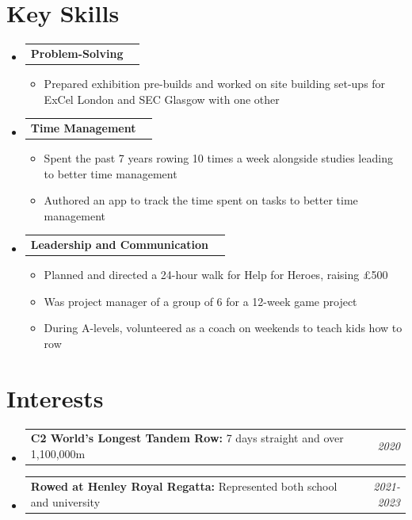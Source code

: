 \documentclass[a4paper,11pt]{article}
\makeatletter
\newcommand{\resumePOR}[3]{
\vspace{0.5mm}\item
    \begin{tabular*}{0.97\textwidth}[t]{l@{\extracolsep{\fill}}r}
        \textbf{#1}\hspace{0.3mm}#2 & \textit{\small{#3}} 
    \end{tabular*}
    \vspace{-2mm}
}
\newcommand{\resumeBasicSubheading}[1]{
\vspace{0.5mm}\item
    \begin{tabular*}{0.98\textwidth}[t]{l@{\extracolsep{\fill}}r}
        \textbf{#1}
    \end{tabular*}
    \vspace{-2.4mm}
}
\newcommand{\resumeSubHeadingListStart}{\begin{itemize}[leftmargin=*,labelsep=0mm]}
\newcommand{\resumeItemListStart}{\begin{justify}\begin{itemize}[leftmargin=3ex, rightmargin=2ex, noitemsep,labelsep=1.2mm,itemsep=0mm]\small}
\newcommand{\resumeSubHeadingListEnd}{\end{itemize}\vspace{2mm}}
\newcommand{\resumeItemListEnd}{\end{itemize}\end{justify}\vspace{-2mm}}
\makeatother
\begin{document}
\section{\textbf{Key Skills}}
\resumeSubHeadingListStart
   \resumeBasicSubheading
   {Problem-Solving}
   \resumeItemListStart
\item {Prepared exhibition pre-builds and worked on site building set-ups for ExCel London and SEC Glasgow with one other}
   \resumeItemListEnd
    \vspace{-2.0mm}
   \resumeBasicSubheading {Time Management}
   \resumeItemListStart
\item{Spent the past 7 years rowing 10 times a week 
        alongside studies leading to better time management}
\item{Authored an app to track the time spent on tasks to better time management}
   \resumeItemListEnd
    \vspace{-2.0mm}
    \resumeBasicSubheading{Leadership and Communication}
    \resumeItemListStart
\item{Planned and directed a 24-hour walk for Help for Heroes, raising £500}
\item{Was project manager of a group of 6 for a 12-week game project}
\item{During A-levels, volunteered as a coach on weekends to teach kids how to row}
    \resumeItemListEnd
    \vspace{-2.0mm}
  \resumeSubHeadingListEnd
\vspace{-5.5mm}


\section{\textbf{Interests}}
\vspace{-0.4mm}
\resumeSubHeadingListStart
\resumePOR{C2 World's Longest Tandem Row: } %
    {7 days straight and over 1,100,000m} %
    {2020} %
    
\resumePOR{Rowed at Henley Royal Regatta: } %
    {Represented both school and university} %
    {2021-2023} %
\resumeSubHeadingListEnd
\vspace{-5mm}



\end{document}
